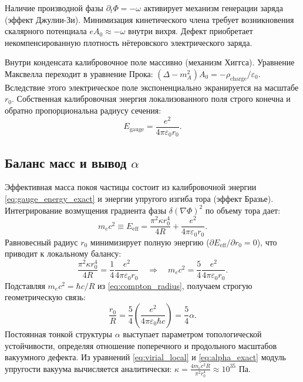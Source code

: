 \documentclass[12pt,a4paper]{article}
\begin{document}
Наличие производной фазы $\partial_t \Phi = -\omega$ активирует механизм генерации заряда (эффект Джулии-Зи). Минимизация кинетического члена требует возникновения скалярного потенциала $e A_0 \approx -\omega$ внутри вихря. Дефект приобретает некомпенсированную плотность нётеровского электрического заряда.

Внутри конденсата калибровочное поле массивно (механизм Хиггса). Уравнение Максвелла переходит в уравнение Прока: $(\Delta - m_A^2) A_0 = -\rho_{\text{charge}} / \varepsilon_0$. Вследствие этого электрическое поле экспоненциально экранируется на масштабе $r_0$. Собственная калибровочная энергия локализованного поля строго конечна и обратно пропорциональна радиусу сечения:
\begin{equation}
E_{\text{gauge}} = \frac{e^2}{4\pi\varepsilon_0 r_0}.
\label{eq:gauge_energy_exact}
\end{equation}

\subsection{Баланс масс и вывод $\alpha$}
Эффективная масса покоя частицы состоит из калибровочной энергии \eqref{eq:gauge_energy_exact} и энергии упругого изгиба тора (эффект Бразье). Интегрирование возмущения градиента фазы $\delta(\nabla \Phi)^2$ по объему тора дает:
\begin{equation}
m_e c^2 \equiv E_{\text{eff}} = \frac{\pi^2 \kappa r_0^4}{4R} + \frac{e^2}{4\pi\varepsilon_0 r_0}.
\label{eq:effective_mass_functional}
\end{equation}
Равновесный радиус $r_0$ минимизирует полную энергию ($\partial E_{\text{eff}} / \partial r_0 = 0$), что приводит к локальному балансу:
\begin{equation}
\frac{\pi^2 \kappa r_0^4}{4R} = \frac{1}{4} \frac{e^2}{4\pi\varepsilon_0 r_0} \quad \Longrightarrow \quad m_e c^2 = \frac{5}{4} \frac{e^2}{4\pi\varepsilon_0 r_0}.
\label{eq:virial_local}
\end{equation}
Подставляя $m_e c^2 = \hbar c / R$ из \eqref{eq:compton_radius}, получаем строгую геометрическую связь:
\begin{equation}
\frac{r_0}{R} = \frac{5}{4} \left( \frac{e^2}{4\pi\varepsilon_0 \hbar c} \right) = \frac{5}{4} \alpha.
\label{eq:alpha_exact}
\end{equation}
Постоянная тонкой структуры $\alpha$ выступает параметром топологической устойчивости, определяя отношение поперечного и продольного масштабов вакуумного дефекта. Из уравнений \eqref{eq:virial_local} и \eqref{eq:alpha_exact} модуль упругости вакуума вычисляется аналитически: $\kappa = \frac{4 m_e c^2 R}{\pi^2 r_0^4} \approx 10^{35}$ Па.
\end{document}

